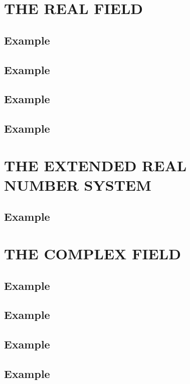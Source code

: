 \section{THE REAL FIELD}

\subsection*{\textbf{Example}}
\label{sec:19}
\subsection*{\textbf{Example}}
\label{sec:20}
\subsection*{\textbf{Example}}
\label{sec:21}
\subsection*{\textbf{Example}}
\label{sec:22}


\section*{THE EXTENDED REAL NUMBER SYSTEM}
\subsection*{\textbf{Example}}
\label{sec:23}



\section{THE COMPLEX FIELD}

\subsection*{\textbf{Example}}
\label{sec:24}

\subsection*{\textbf{Example}}
\label{sec:25}


\subsection*{\textbf{Example}}
\label{sec:26}

\subsection*{\textbf{Example}}
\label{sec:27}
